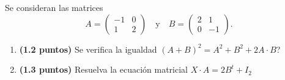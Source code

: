 
Se consideran las matrices
\[
A=\begin{pmatrix}-1&0\\1&2\end{pmatrix}\quad\text{y}\quad B=\begin{pmatrix}2&1\\0&-1\end{pmatrix}.
\]
\begin{enumerate}[label=\alph*)]
\item \textbf{(1.2 puntos)} \textquestiondown{}Se verifica la igualdad $(A+B)^2=A^2+B^2+2A\cdot B$?
\item \textbf{(1.3 puntos)} Resuelva la ecuación matricial $X\cdot A=2B^t+I_2$
\end{enumerate}
